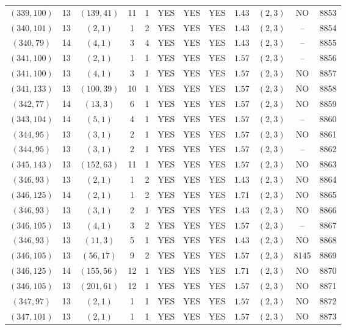 \begin{longtable}{|c|c|c|c|c|c|c|c|c|c|c|c|}
$(339,100)$ & 13 & $(139,41)$ & 11 & 1 & YES & YES & YES & $1.43$ & $(2,3)$ & NO & 8853\\
$(340,101)$ & 13 & $(2,1)$ & 1 & 2 & YES & YES & YES & $1.43$ & $(2,3)$ & -- & 8854\\
$(340,79)$ & 14 & $(4,1)$ & 3 & 4 & YES & YES & YES & $1.43$ & $(2,3)$ & -- & 8855\\
$(341,100)$ & 13 & $(2,1)$ & 1 & 1 & YES & YES & YES & $1.57$ & $(2,3)$ & -- & 8856\\
$(341,100)$ & 13 & $(4,1)$ & 3 & 1 & YES & YES & YES & $1.57$ & $(2,3)$ & NO & 8857\\
$(341,133)$ & 13 & $(100,39)$ & 10 & 1 & YES & YES & YES & $1.57$ & $(2,3)$ & NO & 8858\\
$(342,77)$ & 14 & $(13,3)$ & 6 & 1 & YES & YES & YES & $1.57$ & $(2,3)$ & NO & 8859\\
$(343,104)$ & 14 & $(5,1)$ & 4 & 1 & YES & YES & YES & $1.57$ & $(2,3)$ & -- & 8860\\
$(344,95)$ & 13 & $(3,1)$ & 2 & 1 & YES & YES & YES & $1.57$ & $(2,3)$ & NO & 8861\\
$(344,95)$ & 13 & $(3,1)$ & 2 & 1 & YES & YES & YES & $1.57$ & $(2,3)$ & -- & 8862\\
$(345,143)$ & 13 & $(152,63)$ & 11 & 1 & YES & YES & YES & $1.57$ & $(2,3)$ & NO & 8863\\
$(346,93)$ & 13 & $(2,1)$ & 1 & 2 & YES & YES & YES & $1.43$ & $(2,3)$ & NO & 8864\\
$(346,125)$ & 14 & $(2,1)$ & 1 & 2 & YES & YES & YES & $1.71$ & $(2,3)$ & NO & 8865\\
$(346,93)$ & 13 & $(3,1)$ & 2 & 1 & YES & YES & YES & $1.43$ & $(2,3)$ & NO & 8866\\
$(346,105)$ & 13 & $(4,1)$ & 3 & 2 & YES & YES & YES & $1.57$ & $(2,3)$ & -- & 8867\\
$(346,93)$ & 13 & $(11,3)$ & 5 & 1 & YES & YES & YES & $1.43$ & $(2,3)$ & NO & 8868\\
$(346,105)$ & 13 & $(56,17)$ & 9 & 2 & YES & YES & YES & $1.57$ & $(2,3)$ & 8145 & 8869\\
$(346,125)$ & 14 & $(155,56)$ & 12 & 1 & YES & YES & YES & $1.71$ & $(2,3)$ & NO & 8870\\
$(346,105)$ & 13 & $(201,61)$ & 12 & 1 & YES & YES & YES & $1.57$ & $(2,3)$ & NO & 8871\\
$(347,97)$ & 13 & $(2,1)$ & 1 & 1 & YES & YES & YES & $1.57$ & $(2,3)$ & NO & 8872\\
$(347,101)$ & 13 & $(2,1)$ & 1 & 1 & YES & YES & YES & $1.57$ & $(2,3)$ & NO & 8873\\

\end{longtable}
